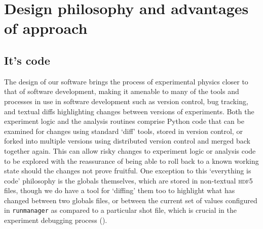 
\section{Design philosophy and advantages of approach}

\subsection{It's code}\label{sec:its_code}
The design of our software brings the process of experimental physics closer to that of software development, making it amenable to many of the tools and processes in use in software development such as version control, bug tracking, and textual diffs highlighting changes between versions of experiments. Both the experiment logic and the analysis routines comprise Python code that can be examined for changes using standard `diff' tools, stored in version control, or forked into multiple versions using distributed version control and merged back together again. This can allow risky changes to experiment logic or analysis code to be explored with the reassurance of being able to roll back to a known working state should the changes not prove fruitful. One exception to this `everything is code' philosophy is the globals themselves, which are stored in non-textual \textsc{hdf5} files, though we do have a tool for `diffing' them too to highlight what has changed between two globals files, or between the current set of values configured in \texttt{runmanager} as compared to a particular shot file, which is crucial in the experiment debugging process ().

